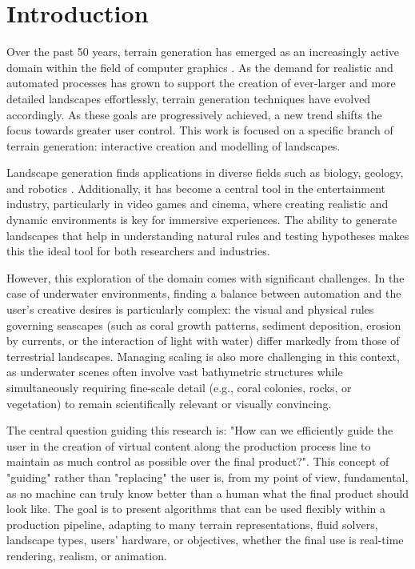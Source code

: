\chapter{Introduction}
\label{chap:introduction}


Over the past 50 years, terrain generation has emerged as an increasingly active domain within the field of computer graphics \cite{Fournier1982,Musgrave1989,Miller1986,Galin2019}. As the demand for realistic and automated processes has grown to support the creation of ever-larger and more detailed landscapes effortlessly, terrain generation techniques have evolved accordingly. As these goals are progressively achieved, a new trend shifts the focus towards greater user control. This work is focused on a specific branch of terrain generation: interactive creation and modelling of landscapes.

Landscape generation finds applications in diverse fields such as biology, geology, and robotics \cite{Tzachor2023,Chen2023,Gerigk2025,Rudin2022}. Additionally, it has become a central tool in the entertainment industry, particularly in video games and cinema, where creating realistic and dynamic environments is key for immersive experiences. The ability to generate landscapes that help in understanding natural rules and testing hypotheses makes this the ideal tool for both researchers and industries.

However, this exploration of the domain comes with significant challenges. In the case of underwater environments, finding a balance between automation and the user's creative desires is particularly complex: the visual and physical rules governing seascapes (such as coral growth patterns, sediment deposition, erosion by currents, or the interaction of light with water) differ markedly from those of terrestrial landscapes. Managing scaling is also more challenging in this context, as underwater scenes often involve vast bathymetric structures while simultaneously requiring fine-scale detail (e.g., coral colonies, rocks, or vegetation) to remain scientifically relevant or visually convincing.

The central question guiding this research is: "How can we efficiently guide the user in the creation of virtual content along the production process line to maintain as much control as possible over the final product?". This concept of "guiding" rather than "replacing" the user is, from my point of view, fundamental, as no machine can truly know better than a human what the final product should look like. The goal is to present algorithms that can be used flexibly within a production pipeline, adapting to many terrain representations, fluid solvers, landscape types, users' hardware, or objectives, whether the final use is real-time rendering, realism, or animation.

